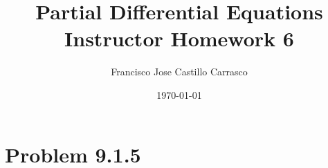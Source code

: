 




\title{Partial Differential Equations\\Instructor Homework 6}
\author{Francisco Jose Castillo Carrasco}
\date{\today}
\maketitle




\section*{Problem 9.1.5}


